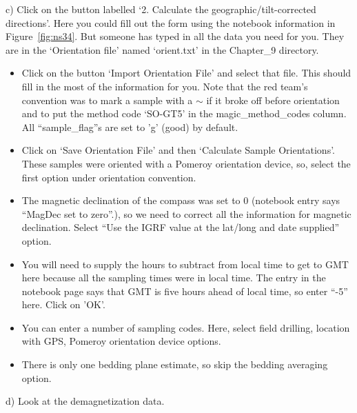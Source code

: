 {c)  Click on the button labelled `2. Calculate the geographic/tilt-corrected directions'.   Here you could fill out the form using the notebook information in Figure~\ref{fig:ns34}.  But someone has typed in all the data you need for you.  They are in the `Orientation file' named `orient.txt' in the Chapter\_9 directory.  
\begin{itemize}
\item Click on the button `Import Orientation File' and select that file.  This should fill in the most of the information for you.   Note that the red team's convention was to mark a sample with a $\sim$ if it broke off before orientation and to put the method code `SO-GT5' in the magic\_method\_codes column.   All  ``sample\_flag''s  are set to 'g'  (good) by default.  
\item Click on `Save Orientation File' and then `Calculate Sample Orientations'.   
These samples were oriented with a Pomeroy orientation device, so, select the first option under orientation convention.  
\item The magnetic declination of the compass was set to 0 (notebook entry says ``MagDec set to zero''.), so we need to correct all the information for magnetic declination.  Select ``Use the IGRF value at the lat/long and date supplied'' option. 
\item You will need to supply the hours to subtract from local time to get to GMT here because all the sampling times were in local time.  The entry in the notebook page says that GMT is five hours ahead of local time, so enter ``-5'' here. Click on 'OK'. 
\item  You can enter a number of sampling codes.  Here, select field drilling,  location with GPS, Pomeroy orientation device  options.   
\item  There is only one bedding plane estimate, so skip the bedding averaging option.
\end{itemize}


d) Look at the demagnetization data. 

}
